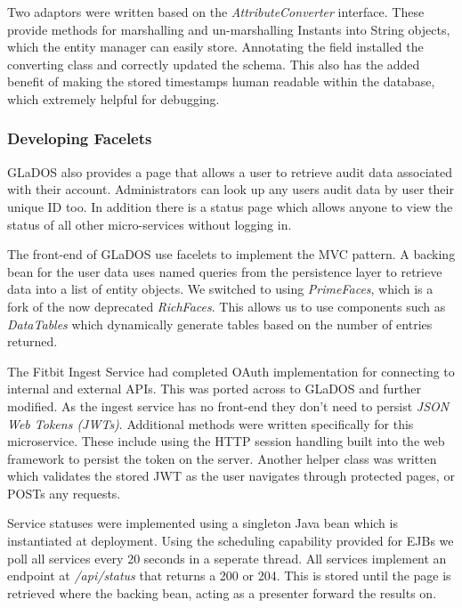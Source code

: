 \par
Two adaptors were written based on the \textit{AttributeConverter} interface. These provide methods for marshalling and un-marshalling Instants into String objects, which the entity manager can easily store. Annotating the field installed the converting class and correctly updated the schema. This also has the added benefit of making the stored timestamps human readable within the database, which extremely helpful for debugging.

\subsubsection{Developing Facelets}
\par
GLaDOS also provides a page that allows a user to retrieve audit data associated with their account. Administrators can look up any users audit data by user their unique ID too. In addition there is a status page which allows anyone to view the status of all other micro-services without logging in.

\par
The front-end of GLaDOS use facelets to implement the MVC pattern. A backing bean for the user data uses named queries from the persistence layer to retrieve data into a list of entity objects. We switched to using \textit{PrimeFaces}\cite{Primefaces}, which is a fork of the now deprecated \textit{RichFaces}. This allows us to use components such as \textit{DataTables} which dynamically generate tables based on the number of entries returned.

\par
The Fitbit Ingest Service had completed OAuth implementation for connecting to internal and external APIs. This was ported across to GLaDOS and further modified. As the ingest service has no front-end they don't need to persist \textit{JSON Web Tokens (JWTs)}. Additional methods were written specifically for this microservice. These include using the HTTP session handling built into the web framework to persist the token on the server. Another helper class was written which validates the stored JWT as the user navigates through protected pages, or POSTs any requests.

\par
Service statuses were implemented using a singleton Java bean which is instantiated at deployment. Using the scheduling capability provided for EJBs we poll all services every 20 seconds in a seperate thread. All services implement an endpoint at \textit{/api/status} that returns a 200 or 204. This is stored until the page is retrieved where the backing bean, acting as a presenter forward the results on.

